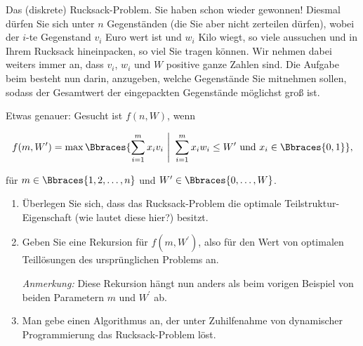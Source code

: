 
\begin{exercise}

Das (diskrete) Rucksack-Problem.
Sie haben schon wieder gewonnen!
Diesmal dürfen Sie sich unter $n$ Gegenständen (die Sie aber nicht zerteilen dürfen), wobei der $i$-te Gegenstand $v_i$ Euro wert ist und $w_i$ Kilo wiegt, so viele aussuchen und in Ihrem Rucksack hineinpacken, so viel Sie tragen können.
Wir nehmen dabei weiters immer an, dass $v_i$, $w_i$ und $W$ positive ganze Zahlen sind.
Die Aufgabe beim  besteht nun darin, anzugeben, welche Gegenstände Sie mitnehmen sollen, sodass der Gesamtwert der eingepackten Gegenstände möglichst groß ist.

Etwas genauer:
Gesucht ist $f(n,W)$, wenn

\begin{align*}
  f(m, W^\prime)
  =
  \max
  \Bbraces
  {
    \sum_{i=1}^m
      x_i v_i
    ~\Bigg |~
    \sum_{i=1}^m
      x_i w_i
    \leq
    W^\prime
    ~\text{und}~
    x_i \in \Bbraces{0, 1}
  },
\end{align*}

für $m \in \Bbraces{1, 2, \dots, n}$ und $W^\prime \in \Bbraces{0, \dots, W}$.

\begin{enumerate}[label = \alph*]

  \item Überlegen Sie sich, dass das Rucksack-Problem die optimale Teilstruktur-Eigenschaft (wie lautet diese hier?) besitzt.

  \item Geben Sie eine Rekursion für $f(m, W^\prime)$, also für den Wert von optimalen Teillösungen des ursprünglichen Problems an.

  \textit{Anmerkung:}
  Diese Rekursion hängt nun anders als beim vorigen Beispiel von beiden Parametern $m$ und $W^\prime$ ab.

  \item Man gebe einen Algorithmus an, der unter Zuhilfenahme von dynamischer Programmierung das Rucksack-Problem löst.

\end{enumerate}

\end{exercise}



